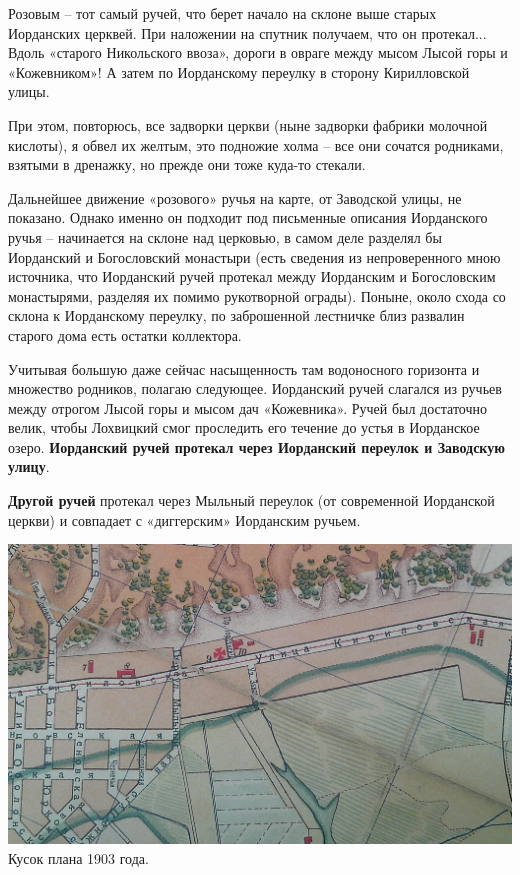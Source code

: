 Розовым – тот самый ручей, что берет начало на склоне выше старых Иорданских церквей. При наложении на спутник получаем, что он протекал... Вдоль «старого Никольского ввоза», дороги в овраге между мысом Лысой горы и «Кожевником»! А затем по Иорданскому переулку в сторону Кирилловской улицы.

При этом, повторюсь, все задворки церкви (ныне задворки фабрики молочной кислоты), я обвел их желтым, это подножие холма – все они сочатся родниками, взятыми в дренажку, но прежде они тоже куда-то стекали.

Дальнейшее движение «розового» ручья на карте, от Заводской улицы, не показано. Однако именно он подходит под письменные описания Иорданского ручья – начинается на склоне над церковью, в самом деле разделял бы Иорданский и Богословский монастыри (есть сведения из непроверенного мною источника, что Иорданский ручей протекал между Иорданским и Богословским монастырями, разделяя их помимо рукотворной ограды). Поныне, около схода со склона к Иорданскому переулку, по заброшенной лестничке близ развалин старого дома есть остатки коллектора.

Учитывая большую даже сейчас насыщенность там водоносного горизонта и множество родников, полагаю следующее. Иорданский ручей слагался из ручьев между отрогом Лысой горы и мысом дач «Кожевника». Ручей был достаточно велик, чтобы Лохвицкий смог проследить его течение до устья в Иорданское озеро. \textbf{Иорданский ручей протекал через Иорданский переулок и Заводскую улицу}.

\textbf{Другой ручей} протекал через Мыльный переулок (от современной Иорданской церкви) и совпадает с «диггерским» Иорданским ручьем.

\begin{center}
\includegraphics[width=\linewidth]{chast-kirvys/iordanruch/map-1903.jpg}\\

Кусок плана 1903 года.
\end{center}

